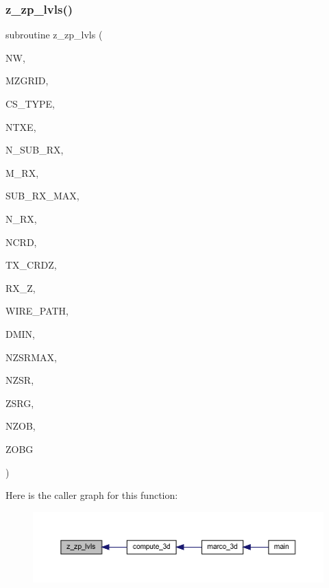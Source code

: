 \subsubsection{\texorpdfstring{z\+\_\+zp\+\_\+lvls()}{z\_zp\_lvls()}}
{\footnotesize\ttfamily subroutine z\+\_\+zp\+\_\+lvls (\begin{DoxyParamCaption}\item[{integer, intent(in)}]{NW,  }\item[{integer, intent(in)}]{M\+Z\+G\+R\+ID,  }\item[{integer, intent(in)}]{C\+S\+\_\+\+T\+Y\+PE,  }\item[{integer, intent(in)}]{N\+T\+XE,  }\item[{integer, dimension(m\+\_\+rx,ntxe), intent(in)}]{N\+\_\+\+S\+U\+B\+\_\+\+RX,  }\item[{integer, intent(in)}]{M\+\_\+\+RX,  }\item[{integer, intent(in)}]{S\+U\+B\+\_\+\+R\+X\+\_\+\+M\+AX,  }\item[{integer, dimension(ntxe), intent(in)}]{N\+\_\+\+RX,  }\item[{integer, intent(in)}]{N\+C\+RD,  }\item[{real, dimension(ncrd,ntxe)}]{T\+X\+\_\+\+C\+R\+DZ,  }\item[{real, dimension(sub\+\_\+rx\+\_\+max,m\+\_\+rx,ntxe), intent(in)}]{R\+X\+\_\+Z,  }\item[{integer, intent(in)}]{W\+I\+R\+E\+\_\+\+P\+A\+TH,  }\item[{real, intent(in)}]{D\+M\+IN,  }\item[{integer, intent(in)}]{N\+Z\+S\+R\+M\+AX,  }\item[{integer, intent(out)}]{N\+Z\+SR,  }\item[{real, dimension(2,mzgrid), intent(out)}]{Z\+S\+RG,  }\item[{integer, intent(out)}]{N\+Z\+OB,  }\item[{real, dimension(mzgrid), intent(out)}]{Z\+O\+BG }\end{DoxyParamCaption})}

Here is the caller graph for this function\+:
\nopagebreak
\begin{figure}[H]
\begin{center}
\leavevmode
\includegraphics[width=350pt]{Marco_8f90_a957825940d4c1d1ff2eabfb92165404e_icgraph}
\end{center}
\end{figure}
